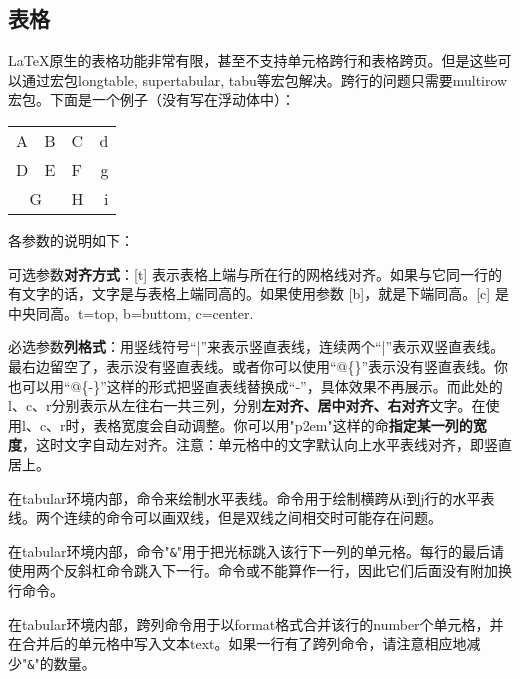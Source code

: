 {\subsection{表格}
\LaTeX 原生的表格功能非常有限，甚至不支持单元格跨行和表格跨页。但是这些可以通过宏包longtable, supertabular, tabu等宏包解决。跨行的问题只需要multirow宏包。下面是一个例子（没有写在浮动体中）：

\begin{codeshow}
\begin{center}
  \begin{tabular}[c]{|l|c||p{3em}
    r@{-}} \hline\hline
    A & B & C & d\\D & E & F & g\\
    \cline{1-2}
    \multicolumn{2}{|c|}{G}&H&i\\
    \hline
  \end{tabular}
\end{center}
\end{codeshow}

各参数的说明如下：
\begin{feai}
\item 可选参数\textbf{对齐方式}：[t] 表示表格上端与所在行的网格线对齐。如果与它同一行的有文字的话，文字是与表格上端同高的。如果使用参数 [b]，就是下端同高。[c] 是中央同高。t=top, b=buttom, c=center. 
\item 必选参数\textbf{列格式}：用竖线符号“|”来表示竖直表线，连续两个“|”表示双竖直表线。最右边留空了，表示没有竖直表线。或者你可以使用“@\{\}”表示没有竖直表线。你也可以用“@\{-\}”这样的形式把竖直表线替换成“-”，具体效果不再展示。而此处的l、c、r分别表示从左往右一共三列，分别\textbf{左对齐、居中对齐、右对齐}文字。在使用l、c、r时，表格宽度会自动调整。你可以用"p{2em}"这样的命\textbf{指定某一列的宽度}，这时文字自动左对齐。注意：单元格中的文字默认向上水平表线对齐，即竖直居上。
\item 在tabular环境内部，命令\latexline{\\hline}来绘制水平表线。命令用于绘制横跨从i到j行的水平表线。两个连续的\latexline{\\hline}命令可以画双线，但是双线之间相交时可能存在问题。
\item 在tabular环境内部，命令"\texttt{\&}"用于把光标跳入该行下一列的单元格。每行的最后请使用两个反斜杠命令跳入下一行。命令\latexline{\\hline}或\latexline{\\cline}不能算作一行，因此它们后面没有附加换行命令。
\item 在tabular环境内部，跨列命令用于以format格式合并该行的number个单元格，并在合并后的单元格中写入文本text。如果一行有了跨列命令，请注意相应地减少"\texttt{\&}"的数量。
\end{feai}

}
